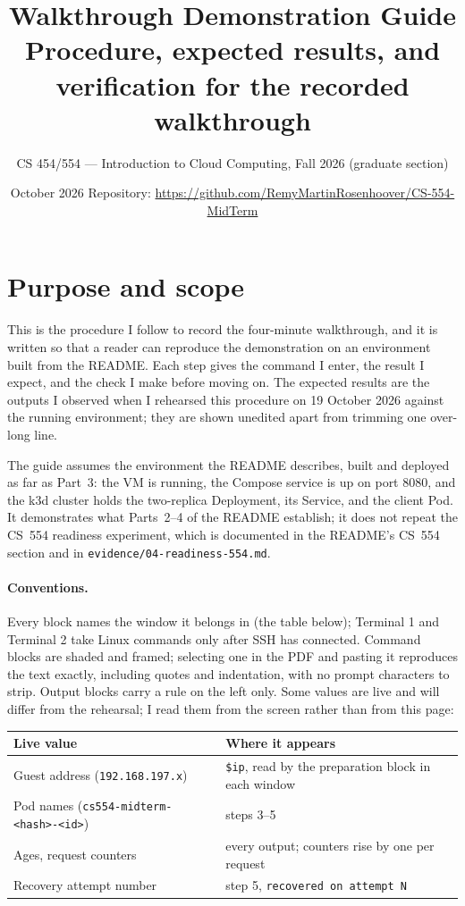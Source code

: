 \documentclass[11pt,letterpaper]{article}
\title{Walkthrough Demonstration Guide\\
\large Procedure, expected results, and verification for the recorded walkthrough}
\author{CS 454/554 --- Introduction to Cloud Computing, Fall 2026 (graduate section)}
\date{October 2026 \quad\textbullet\quad Repository: \url{https://github.com/RemyMartinRosenhoover/CS-554-MidTerm}}
\newcommand{\code}[1]{\texttt{#1}}
\begin{document}
\maketitle

\section{Purpose and scope}

This is the procedure I follow to record the four-minute walkthrough, and it is written so that a reader can reproduce the demonstration on an environment built from the README. Each step gives the command I enter, the result I expect, and the check I make before moving on. The expected results are the outputs I observed when I rehearsed this procedure on 19 October 2026 against the running environment; they are shown unedited apart from trimming one over-long line.

The guide assumes the environment the README describes, built and deployed as far as Part~3: the VM is running, the Compose service is up on port 8080, and the k3d cluster holds the two-replica Deployment, its Service, and the client Pod. It demonstrates what Parts~2--4 of the README establish; it does not repeat the CS~554 readiness experiment, which is documented in the README's CS~554 section and in \code{evidence/04-readiness-554.md}.

\paragraph{Conventions.} Every block names the window it belongs in (the table below); Terminal 1 and Terminal 2 take Linux commands only after SSH has connected. Command blocks are shaded and framed; selecting one in the PDF and pasting it reproduces the text exactly, including quotes and indentation, with no prompt characters to strip. Output blocks carry a rule on the left only. Some values are live and will differ from the rehearsal; I read them from the screen rather than from this page:

\begin{center}\small
\begin{tabular}{@{}ll@{}}
\toprule
Live value & Where it appears \\
\midrule
Guest address (\code{192.168.197.x}) & \code{\$ip}, read by the preparation block in each window \\
Pod names (\code{cs554-midterm-<hash>-<id>}) & steps 3--5 \\
Ages, request counters & every output; counters rise by one per request \\
Recovery attempt number & step 5, \code{recovered on attempt N} \\
\bottomrule
\end{tabular}
\end{center}
\end{document}
